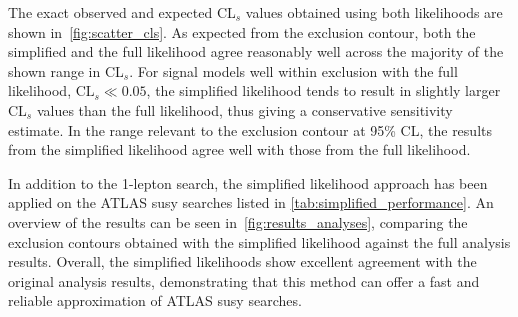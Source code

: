 The exact observed and expected CL$_s$ values obtained using both likelihoods are shown in~\cref{fig:scatter_cls}. As expected from the exclusion contour, both the simplified and the full likelihood agree reasonably well across the majority of the shown range in CL$_s$. For signal models well within exclusion with the full likelihood, \ie $\mathrm{CL}_s \ll 0.05$, the simplified likelihood tends to result in slightly larger CL$_s$ values than the full likelihood, thus giving a conservative sensitivity estimate. In the range relevant to the exclusion contour at 95\% CL, the results from the simplified likelihood agree well with those from the full likelihood.

In addition to the 1-lepton search, the simplified likelihood approach has been applied on the ATLAS \gls{susy} searches listed in \cref{tab:simplified_performance}. An overview of the results can be seen in~\cref{fig:results_analyses}, comparing the exclusion contours obtained with the simplified likelihood against the full analysis results. Overall, the simplified likelihoods show excellent agreement with the original analysis results, demonstrating that this method can offer a fast and reliable approximation of ATLAS \gls{susy} searches.


